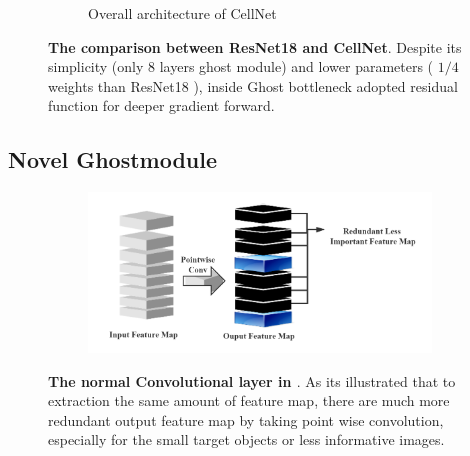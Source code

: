 \begin{figure}[h]
\begin{center}
\begin{subfigure}[t]{0.49\textwidth}
			\caption{Overall architecture of CellNet}
			\label{fig:cellnet}
		\end{subfigure}
	\end{center}
	\caption{\textbf{The comparison between ResNet18 \cite{20} and CellNet}. Despite its simplicity (only 8 layers ghost module) and lower parameters ( $1/4$ weights than ResNet18 \cite{20}), inside Ghost bottleneck adopted residual function for deeper gradient forward.}
\end{figure}








\subsection{Novel Ghostmodule} %
\label{sub:amet}

\begin{figure}[h]
	\begin{center}
		\begin{subfigure}[b]{\textwidth}
		    \centering
			\includegraphics[width=\textwidth]{thesis-template-master/images/normal conv.png}
			
			\label{fig:cellnet}
		\end{subfigure}
	\end{center}
	\caption{\textbf{The normal Convolutional layer in \cite{26}\cite{27}\cite{28}}. As its illustrated that to extraction the same amount of feature map, there are much more redundant output feature map by taking point wise convolution, especially for the small target objects or less informative images.}
\end{figure}


